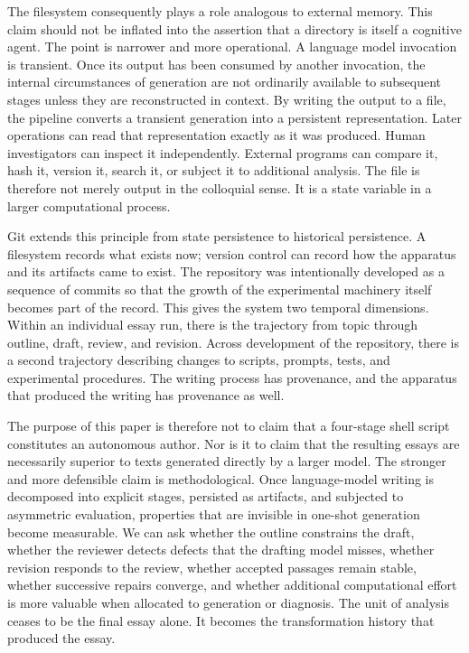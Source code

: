 \documentclass[11pt]{article}
\begin{document}
The filesystem consequently plays a role analogous to external memory. This claim should not be inflated into the assertion that a directory is itself a cognitive agent. The point is narrower and more operational. A language model invocation is transient. Once its output has been consumed by another invocation, the internal circumstances of generation are not ordinarily available to subsequent stages unless they are reconstructed in context. By writing the output to a file, the pipeline converts a transient generation into a persistent representation. Later operations can read that representation exactly as it was produced. Human investigators can inspect it independently. External programs can compare it, hash it, version it, search it, or subject it to additional analysis. The file is therefore not merely output in the colloquial sense. It is a state variable in a larger computational process.

Git extends this principle from state persistence to historical persistence. A filesystem records what exists now; version control can record how the apparatus and its artifacts came to exist. The repository was intentionally developed as a sequence of commits so that the growth of the experimental machinery itself becomes part of the record. This gives the system two temporal dimensions. Within an individual essay run, there is the trajectory from topic through outline, draft, review, and revision. Across development of the repository, there is a second trajectory describing changes to scripts, prompts, tests, and experimental procedures. The writing process has provenance, and the apparatus that produced the writing has provenance as well.

The purpose of this paper is therefore not to claim that a four-stage shell script constitutes an autonomous author. Nor is it to claim that the resulting essays are necessarily superior to texts generated directly by a larger model. The stronger and more defensible claim is methodological. Once language-model writing is decomposed into explicit stages, persisted as artifacts, and subjected to asymmetric evaluation, properties that are invisible in one-shot generation become measurable. We can ask whether the outline constrains the draft, whether the reviewer detects defects that the drafting model misses, whether revision responds to the review, whether accepted passages remain stable, whether successive repairs converge, and whether additional computational effort is more valuable when allocated to generation or diagnosis. The unit of analysis ceases to be the final essay alone. It becomes the transformation history that produced the essay.
\end{document}
